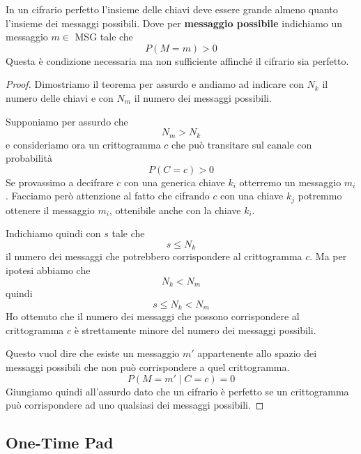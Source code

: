 \begin{theorem}[Shannon]
	In un cifrario perfetto l'insieme delle chiavi deve essere grande almeno quanto l'insieme dei messaggi possibili.
	Dove per \textbf{messaggio possibile} indichiamo un messaggio $m \in$ MSG tale che
	\[ P(M = m) > 0 \]
	Questa \`e condizione necessaria ma non sufficiente affinch\'e il cifrario sia perfetto.
	\begin{proof}
		Dimostriamo il teorema per assurdo e andiamo ad indicare con $N_k$ il numero delle chiavi e con $N_m$ il numero
		dei messaggi possibili.

		Supponiamo per assurdo che
		\[ N_m > N_k \]
		e consideriamo ora un crittogramma $c$ che pu\`o transitare sul canale con probabilit\`a
		\[ P(C = c) > 0 \]
		Se provassimo a decifrare $c$ con una generica chiave $k_i$ otterremo un messaggio $m_i$. Facciamo per\`o
		attenzione al fatto che cifrando $c$ con una chiave $k_j$ potremmo ottenere il messaggio $m_i$, ottenibile anche
		con la chiave $k_i$.

		Indichiamo quindi con $s$ tale che
		\[ s \leq N_k \]
		il numero dei messaggi che potrebbero corrispondere al crittogramma $c$. Ma per ipotesi abbiamo che
		\[ N_k < N_m \]
		quindi
		\[ s \leq N_k < N_m \]
		Ho ottenuto che il numero dei messaggi che possono corrispondere al crittogramma $c$ \`e strettamente minore
		del numero dei messaggi possibili.

		Questo vuol dire che esiste un messaggio $m'$ appartenente allo spazio dei messaggi possibili che non pu\`o
		corrispondere a quel crittogramma.
		\[ P(M = m' \mid C = c) = 0 \]
		Giungiamo quindi all'assurdo dato che un cifrario \`e perfetto se un crittogramma pu\`o corrispondere ad uno
		qualsiasi dei messaggi possibili.
	\end{proof}
\end{theorem}

\subsection{One-Time Pad}